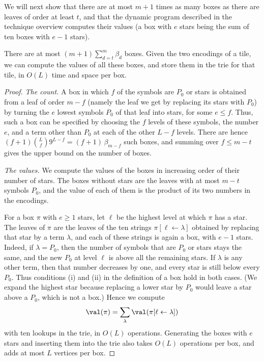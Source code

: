 We will next show that there are at most $m+1$ times as many boxes as there are leaves of order at least $t$, and that the dynamic program described in the technique overview computes their values (a box with $e$ stars being the sum of ten boxes with $e-1$ stars).

\begin{lemma}\label{lem:allboxes}
There are at most $(m+1)\sum_{d=t}^{m}\beta_d$ boxes. Given the two encodings of a tile, we can compute the values of all these boxes, and store them in the trie for that tile, in $O(L)$ time and space per box.
\end{lemma}

\begin{proof}
\emph{The count.} A box in which $f$ of the symbols are $P_0$ or stars is obtained from a leaf of order $m-f$ (namely the leaf we get by replacing its stars with $P_0$) by turning the $e$ lowest symbols $P_0$ of that leaf into stars, for some $e\le f$. Thus, such a box can be specified by choosing the $f$ levels of these symbols, the number $e$, and a term other than $P_0$ at each of the other $L-f$ levels. There are hence $(f+1)\binom Lf9^{L-f}=(f+1)\,\beta_{m-f}$ such boxes, and summing over $f\le m-t$ gives the upper bound on the number of boxes.

\emph{The values.} We compute the values of the boxes in increasing order of their number of stars. The boxes without stars are the leaves with at most $m-t$ symbols $P_0$, and the value of each of them is the product of its two numbers in the encodings.

For a box $\pi$ with $e\ge1$ stars, let $\ell$ be the highest level at which $\pi$ has a star. The leaves of $\pi$ are the leaves of the ten strings $\pi[\ell\leftarrow\lambda]$ obtained by replacing that star by a term $\lambda$, and each of these strings is again a box, with $e-1$ stars. Indeed, if $\lambda=P_0$, then the number of symbols that are $P_0$ or stars stays the same, and the new $P_0$ at level $\ell$ is above all the remaining stars. If $\lambda$ is any other term, then that number decreases by one, and every star is still below every $P_0$. Thus conditions (i) and (ii) in the definition of a box hold in both cases. (We expand the highest star because replacing a lower star by $P_0$ would leave a star above a $P_0$, which is not a box.) Hence we compute
\[
\val(\pi)=\sum_\lambda\val(\pi[\ell\leftarrow\lambda])
\]
with ten lookups in the trie, in $O(L)$ operations. Generating the boxes with $e$ stars and inserting them into the trie also takes $O(L)$ operations per box, and adds at most $L$ vertices per box.
\end{proof}

